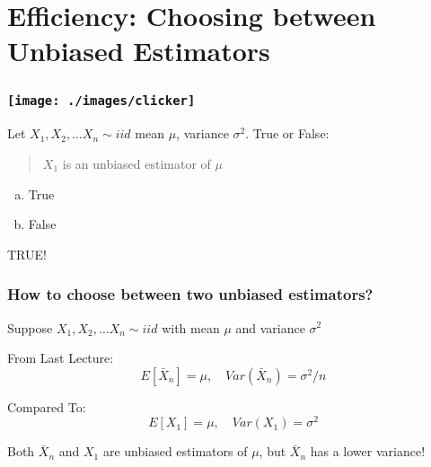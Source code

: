 \section{Efficiency: Choosing between Unbiased Estimators}
%
%
%
%
%
\begin{frame}
\frametitle{\texttt{[image: ./images/clicker]}}
Let $X_1, X_2, \hdots X_n \sim iid$ mean $\mu$, variance $\sigma^2$. True or False:

\vspace{1em}
\begin{quotation}
$X_1$ is an unbiased estimator of $\mu$
\end{quotation}

\begin{enumerate}[(a)]
\item True
\item False
\end{enumerate}

\pause \alert{TRUE!}
\end{frame}
\begin{frame}
\frametitle{How to choose between two unbiased estimators?}

Suppose $X_1, X_2, \hdots X_n \sim iid$ with mean $\mu$ and variance $\sigma^2$

\begin{block}{From Last Lecture:}
\vspace{-1em}
\[
E[\bar{X}_n] = \mu, \quad
Var(\bar{X}_n) =\sigma^2/n
\]
\end{block}

\begin{block}{Compared To:}
  \vspace{-1em}
\[
  E[X_1] = \mu, \quad
Var(X_1) = \sigma^2
\]
\end{block}

\alert{Both $\bar{X}_n$ and $X_1$ are unbiased estimators of $\mu$, but $\bar{X}_n$ has a lower variance!}

\end{frame}

